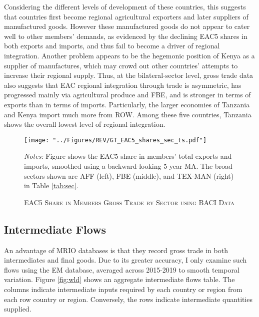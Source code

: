 \documentclass[a4paper]{article}
\begin{document}
Considering the different levels of development of these countries, this suggests that countries first become regional agricultural exporters and later suppliers of manufactured goods. However these manufactured goods do not appear to cater well to other members' demands, as evidenced by the declining EAC5 shares in both exports and imports, and thus fail to become a driver of regional integration. Another problem appears to be the hegemonic position of Kenya as a supplier of manufactures, which may crowd out other countries' attempts to increase their regional supply. Thus, at the bilateral-sector level, gross trade data also suggests that EAC regional integration through trade is asymmetric, has progressed mainly via agricultural produce and FBE, and is stronger in terms of exports than in terms of imports. Particularly, the larger economies of Tanzania and Kenya import much more from ROW. Among these five countries, Tanzania shows the overall lowest level of regional integration. 

\begin{figure}[h!] 
\centering
\caption{\label{fig:GTEACsharesSec}\textsc{EAC5 Share in Members Gross Trade by Sector using BACI Data}}
\texttt{[image: "../Figures/REV/GT\_EAC5\_shares\_sec\_ts.pdf"]} \raggedright
\scriptsize 
\emph{Notes:} Figure shows the EAC5 share in members' total exports and imports, smoothed using a backward-looking 5-year MA. The broad sectors shown are AFF (left), FBE (middle), and TEX-MAN (right) in Table \ref{tab:sec}.
\end{figure}
\FloatBarrier


\subsection{Intermediate Flows}

An advantage of MRIO databases is that they record gross trade in both intermediates and final goods. Due to its greater accuracy, I only examine such flows using the EM database, averaged across 2015-2019 to smooth temporal variation. Figure \ref{fig:wld} shows an aggregate intermediate flows table. The columns indicate intermediate inputs required by each country or region from each row country or region. Conversely, the rows indicate intermediate quantities supplied. \newline %
\end{document}
